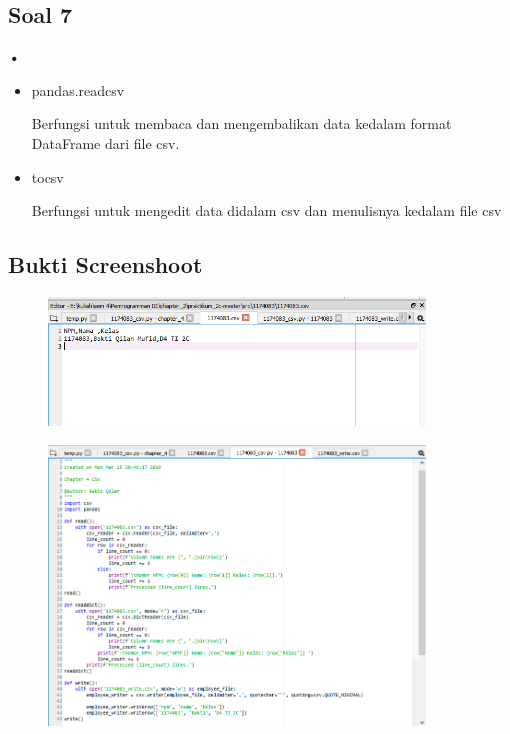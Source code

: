 \subsection{Soal 7}

\textbf{•}

\begin{itemize}
\item pandas.read\textunderscore csv

Berfungsi untuk membaca dan mengembalikan data kedalam format DataFrame dari file csv.

\item to\textunderscore csv

Berfungsi untuk mengedit data didalam csv dan menulisnya kedalam file csv


\end{itemize}


\subsection{Bukti Screenshoot}
\begin{figure}[H]
	\includegraphics[width=10cm]{figures/4/1174083/Teori/kode_teori_1.png}
	\centering
\end{figure}

\begin{figure}[H]
	\includegraphics[width=10cm]{figures/4/1174083/Teori/kode_teori_2.png}
	\centering
\end{figure}

